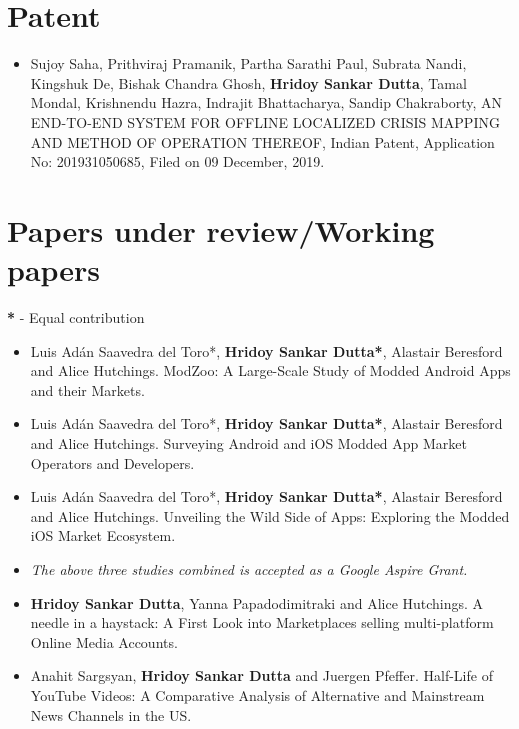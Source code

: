 \documentclass[margin, centered,lmodern]{res}
\begin{document}
\begin{resume}
\section{Patent}
\begin{itemize}[leftmargin=*]

\item Sujoy Saha,  Prithviraj Pramanik,  Partha Sarathi Paul,  Subrata Nandi,  Kingshuk De,  Bishak Chandra Ghosh,  \textbf{Hridoy Sankar Dutta},  Tamal Mondal,  Krishnendu Hazra,  Indrajit Bhattacharya,  Sandip Chakraborty,  AN END-TO-END SYSTEM FOR OFFLINE LOCALIZED CRISIS MAPPING AND METHOD OF OPERATION THEREOF,  Indian Patent,  Application No: 201931050685,  Filed on 09 December, 2019.

\end{itemize}

\section{Papers under review/Working papers}
\textbf{*} - Equal contribution
\begin{itemize}[leftmargin=*]
\item Luis Adán Saavedra del Toro*,  \textbf{Hridoy Sankar Dutta*}, Alastair Beresford and Alice Hutchings.  ModZoo: A Large-Scale Study of Modded Android Apps and their Markets.
\item Luis Adán Saavedra del Toro*,  \textbf{Hridoy Sankar Dutta*}, Alastair Beresford and Alice Hutchings.  Surveying Android and iOS Modded App Market Operators and Developers.
\item Luis Adán Saavedra del Toro*,  \textbf{Hridoy Sankar Dutta*}, Alastair Beresford and Alice Hutchings.  Unveiling the Wild Side of Apps: Exploring the Modded iOS Market Ecosystem.
\item[] \textit{The above three studies combined is accepted as a Google Aspire Grant.}
\item \textbf{Hridoy Sankar Dutta},  Yanna Papadodimitraki and Alice Hutchings.  A needle in a haystack: A First Look into Marketplaces selling multi-platform Online Media Accounts.
\item Anahit Sargsyan, \textbf{Hridoy Sankar Dutta} and Juergen Pfeffer.  Half-Life of YouTube Videos: A Comparative Analysis of Alternative and Mainstream News Channels in the US.
\end{itemize}



\end{resume}
\end{document}
